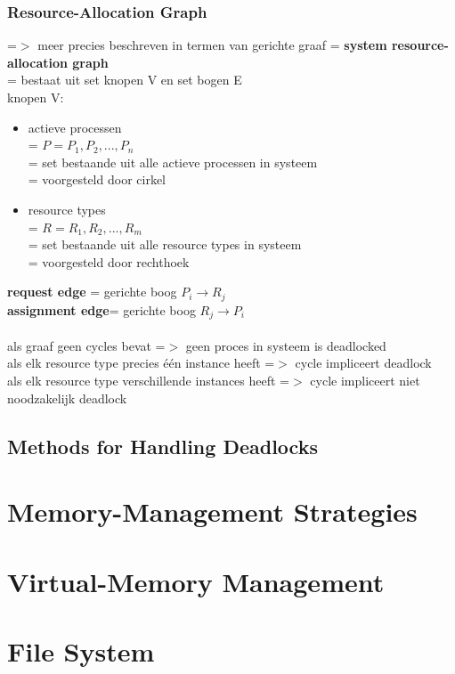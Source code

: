\documentclass{report}
\begin{document}
\subsection{Resource-Allocation Graph}
=$>$ meer precies beschreven in termen van gerichte graaf = \textbf{system resource-allocation graph}
\\= bestaat uit set knopen V en set bogen E
\\knopen V:
\begin{itemize}
\item actieve processen
\\= $P = {P_{1},P_{2},...,P_{n}}$
\\= set bestaande uit alle actieve processen in systeem
\\= voorgesteld door cirkel
\item resource types
\\= $R = {R_{1},R_{2},...,R_{m}}$
\\= set bestaande uit alle resource types in systeem
\\= voorgesteld door rechthoek

\end{itemize}
\textbf{request edge} = gerichte boog $P_{i} \rightarrow R_{j}$
\\\textbf{assignment edge}= gerichte boog $R_{j} \rightarrow P_{i}$
\\
\\als graaf geen cycles bevat =$>$ geen proces in systeem is deadlocked
\\als elk resource type precies \'e\'en instance heeft =$>$ cycle impliceert deadlock
\\als elk resource type verschillende instances heeft =$>$ cycle impliceert niet noodzakelijk deadlock

\section{Methods for Handling Deadlocks}

\chapter{Memory-Management Strategies}
\chapter{Virtual-Memory Management}
\chapter{File System}
\end{document}
